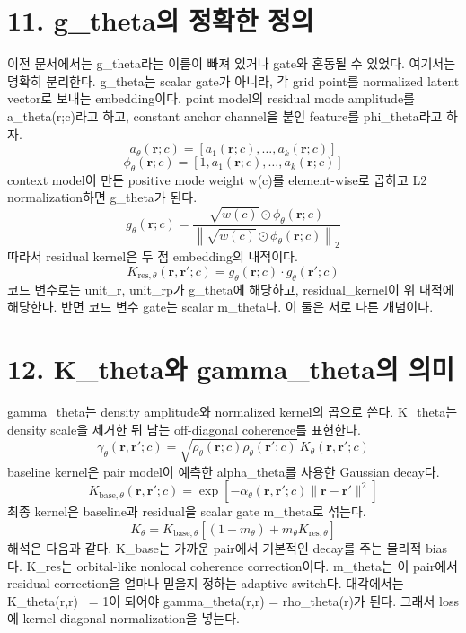 \documentclass[11pt]{article}
\begin{document}
\section*{11. g\_theta의 정확한 정의}
이전 문서에서는 g\_theta라는 이름이 빠져 있거나 gate와 혼동될 수 있었다. 여기서는 명확히 분리한다. g\_theta는 scalar gate가 아니라, 각 grid point를 normalized latent vector로 보내는 embedding이다.
point model의 residual mode amplitude를 a\_theta(r;c)라고 하고, constant anchor channel을 붙인 feature를 phi\_theta라고 하자.
\[
a_\theta(\mathbf{r};c)=\left[a_1(\mathbf{r};c),\ldots,a_k(\mathbf{r};c)\right]
\]
\[
\phi_\theta(\mathbf{r};c)=\left[1,a_1(\mathbf{r};c),\ldots,a_k(\mathbf{r};c)\right]
\]
context model이 만든 positive mode weight w(c)를 element-wise로 곱하고 L2 normalization하면 g\_theta가 된다.
\[
g_\theta(\mathbf{r};c)=\frac{\sqrt{w(c)}\odot\phi_\theta(\mathbf{r};c)}{\left\|\sqrt{w(c)}\odot\phi_\theta(\mathbf{r};c)\right\|_2}
\]
따라서 residual kernel은 두 점 embedding의 내적이다.
\[
K_{\mathrm{res},\theta}(\mathbf{r},\mathbf{r}';c)=g_\theta(\mathbf{r};c)\cdot g_\theta(\mathbf{r}';c)
\]
코드 변수로는 unit\_r, unit\_rp가 g\_theta에 해당하고, residual\_kernel이 위 내적에 해당한다. 반면 코드 변수 gate는 scalar m\_theta다. 이 둘은 서로 다른 개념이다.
\section*{12. K\_theta와 gamma\_theta의 의미}
gamma\_theta는 density amplitude와 normalized kernel의 곱으로 쓴다. K\_theta는 density scale을 제거한 뒤 남는 off-diagonal coherence를 표현한다.
\[
\gamma_\theta(\mathbf{r},\mathbf{r}';c)=\sqrt{\rho_\theta(\mathbf{r};c)\rho_\theta(\mathbf{r}';c)}\,K_\theta(\mathbf{r},\mathbf{r}';c)
\]
baseline kernel은 pair model이 예측한 alpha\_theta를 사용한 Gaussian decay다.
\[
K_{\mathrm{base},\theta}(\mathbf{r},\mathbf{r}';c)=\exp\left[-\alpha_\theta(\mathbf{r},\mathbf{r}';c)\|\mathbf{r}-\mathbf{r}'\|^2\right]
\]
최종 kernel은 baseline과 residual을 scalar gate m\_theta로 섞는다.
\[
K_\theta=K_{\mathrm{base},\theta}\left[(1-m_\theta)+m_\theta K_{\mathrm{res},\theta}\right]
\]
해석은 다음과 같다. K\_base는 가까운 pair에서 기본적인 decay를 주는 물리적 bias다. K\_res는 orbital-like nonlocal coherence correction이다. m\_theta는 이 pair에서 residual correction을 얼마나 믿을지 정하는 adaptive switch다.
대각에서는 K\_theta(r,r) ~= 1이 되어야 gamma\_theta(r,r) = rho\_theta(r)가 된다. 그래서 loss에 kernel diagonal normalization을 넣는다.
\end{document}
